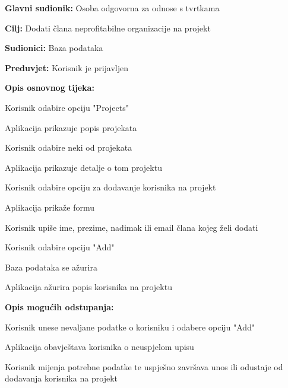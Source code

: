 					\noindent {}
					\begin{packed_item}

						\item \textbf{Glavni sudionik:} Osoba odgovorna za odnose s tvrtkama
						\item \textbf{Cilj:} Dodati člana neprofitabilne organizacije na projekt
						\item \textbf{Sudionici:} Baza podataka
						\item \textbf{Preduvjet:} Korisnik je prijavljen
						\item \textbf{Opis osnovnog tijeka:}
					
						\item[] \begin{packed_enum}
					
							\item Korisnik odabire opciju "Projects"
							\item Aplikacija prikazuje popis projekata
							\item Korisnik odabire neki od projekata
							\item Aplikacija prikazuje detalje o tom projektu
							\item Korisnik odabire opciju za dodavanje korisnika na projekt
							\item Aplikacija prikaže formu
							\item Korisnik upiše ime, prezime, nadimak ili email člana kojeg želi dodati
							\item Korisnik odabire opciju "Add"
							\item Baza podataka se ažurira
							\item Aplikacija ažurira popis korisnika na projektu
						\end{packed_enum}
					
						\item \textbf{Opis mogućih odstupanja:}
					
						\item[] \begin{packed_item}
                        
                        	\item[7.b] Korisnik unese nevaljane podatke o korisniku i odabere opciju "Add"
							\item[] \begin{packed_enum}

								\item Aplikacija obavještava korisnika o neuspjelom upisu
								\item Korisnik mijenja potrebne podatke te uspješno završava unos ili
								odustaje od dodavanja korisnika na projekt

							\end{packed_enum}
					
						\end{packed_item}
					\end{packed_item}

